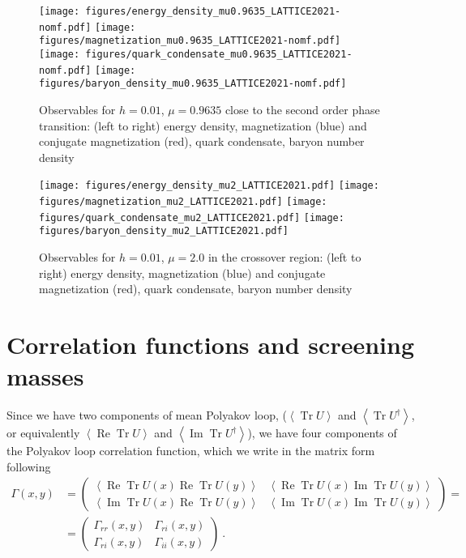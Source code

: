 \documentclass[a4paper,11pt]{article}
\DeclareMathOperator{\TR}{Tr}
\DeclareMathOperator{\RE}{Re}
\DeclareMathOperator{\IM}{Im}
\begin{document}
\begin{figure}
\centering
\texttt{[image: figures/energy\_density\_mu0.9635\_LATTICE2021-nomf.pdf]}
\texttt{[image: figures/magnetization\_mu0.9635\_LATTICE2021-nomf.pdf]} 
\texttt{[image: figures/quark\_condensate\_mu0.9635\_LATTICE2021-nomf.pdf]}
\texttt{[image: figures/baryon\_density\_mu0.9635\_LATTICE2021-nomf.pdf]}
\caption{Observables for $h=0.01$,  $\mu = 0.9635$ close to the second order phase transition: (left to right) energy density,
 magnetization (blue) and conjugate magnetization (red), quark condensate, baryon number density}
\label{fig:second-order}
\end{figure}

\begin{figure}
\centering
\texttt{[image: figures/energy\_density\_mu2\_LATTICE2021.pdf]}
\texttt{[image: figures/magnetization\_mu2\_LATTICE2021.pdf]} 
\texttt{[image: figures/quark\_condensate\_mu2\_LATTICE2021.pdf]}
\texttt{[image: figures/baryon\_density\_mu2\_LATTICE2021.pdf]}
\caption{Observables for $h=0.01$,  $\mu = 2.0$ in the crossover region: (left to right) energy density,
 magnetization (blue) and conjugate magnetization (red), quark condensate, baryon number density}
\label{fig:crossover}
\end{figure}

\section{Correlation functions and screening masses}

Since we have two components of mean Polyakov loop, 
($\left\langle \TR U \right\rangle$ and 
$\left\langle \TR U^\dagger \right\rangle$, or equivalently
$\left\langle \RE \TR U \right\rangle$ and 
$\left\langle \IM \TR U^\dagger \right\rangle$), 
we have four components of the Polyakov loop correlation function, which we write in the matrix form following~\cite{correlation-matrix}
\begin{align}
\label{corr-matrix}
\Gamma(x,y) &= \begin{pmatrix}
\left\langle \RE \TR U(x) \RE \TR U(y) \right\rangle & 
\left\langle \RE \TR U(x) \IM \TR U(y) \right\rangle \\
\left\langle \IM \TR U(x) \RE \TR U(y) \right\rangle & 
\left\langle \IM \TR U(x) \IM \TR U(y) \right\rangle 
\end{pmatrix} = \ \\
\nonumber
&= \begin{pmatrix}
\Gamma_{rr}(x,y) & 
\Gamma_{ri}(x,y) \\
\Gamma_{ri}(x,y) & 
\Gamma_{ii}(x,y) 
\end{pmatrix} \ .
\end{align}
\end{document}
